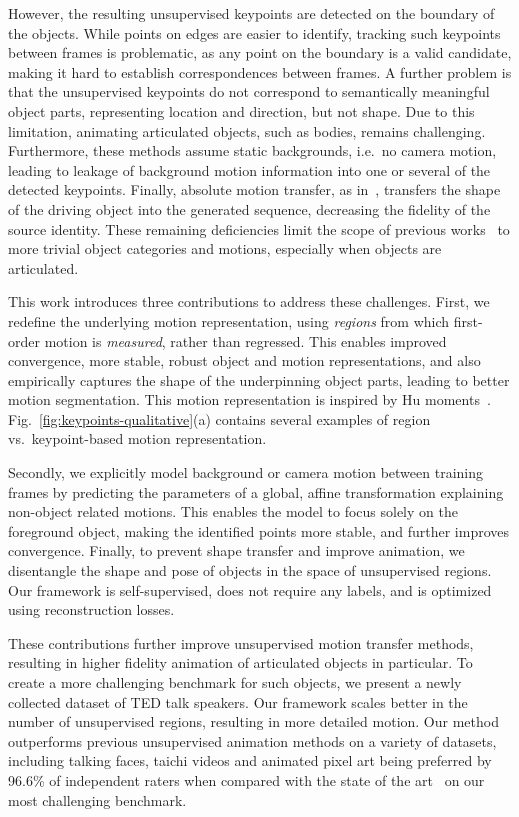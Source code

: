 \documentclass[final]{cvpr}
\begin{document}
However, the resulting unsupervised keypoints are detected on the boundary of the objects. While points on edges are easier to identify, tracking such keypoints between frames is problematic, as any point on the boundary is a valid candidate, making it hard to establish correspondences between frames. A further problem is that the unsupervised keypoints do not correspond to semantically meaningful object parts, representing location and direction, but not shape. Due to this limitation, animating articulated objects, such as bodies, remains challenging. Furthermore, these methods assume static backgrounds, i.e.\ no camera motion, leading to leakage of background motion information into one or several of the detected keypoints. Finally, absolute motion transfer, as in~\cite{fomm}, transfers the shape of the driving object into the generated sequence, decreasing the fidelity of the source identity.
These remaining deficiencies limit the scope of previous works~\cite{fomm,siarohin2018animating} to more trivial object categories and motions, especially when objects are articulated.

This work introduces three contributions to address these challenges. First, we redefine the underlying motion representation, using \emph{regions} from which first-order motion is \emph{measured}, rather than regressed. This enables improved convergence, more stable, robust object and motion representations, and also empirically captures the shape of the underpinning object parts, leading to better motion segmentation. This motion representation is inspired by Hu moments~\cite{davis1997representation}.
Fig.~\ref{fig:keypoints-qualitative}(a) contains several examples of region vs.\ keypoint-based motion representation.

Secondly, we explicitly model background or camera motion between training frames by predicting the parameters of a global, affine transformation explaining non-object related motions. This enables the model to focus solely on the foreground object, making the identified points more stable, and further improves convergence.
Finally, to prevent shape transfer and improve animation, we disentangle the shape and pose of objects in the space of unsupervised regions. Our framework is self-supervised, does not require any labels, and is optimized using reconstruction losses.

These contributions further improve unsupervised motion transfer methods, resulting in higher fidelity animation of articulated objects in particular. To create a more challenging benchmark for such objects, we present a newly collected dataset of TED talk speakers. Our framework scales better in the number of unsupervised regions, resulting in more detailed motion. Our method outperforms previous unsupervised animation methods on a variety of datasets, including talking faces, taichi videos and animated pixel art being preferred by 96.6\% of independent raters when compared with the state of the art~\cite{fomm} on our most challenging benchmark.
\vspace{-0.2cm}
\end{document}
